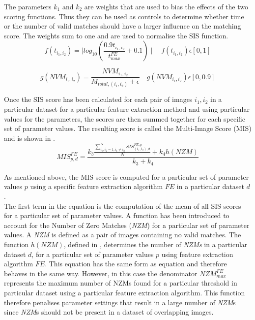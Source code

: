 \documentclass{article}
\begin{document}
The parameters $k_1$ and $k_2$ are weights that are used to bias the effects of the two scoring functions. Thus they can be used as controls to determine whether time or the number of valid matches should have a larger influence on the matching score. The weights sum to one and are used to normalise the SIS function.\\

\begin{equation}
f(t_{i_1, i_2}) = \mid log_{10}(\frac{0.9 t_{i_1, i_2}}{t_{max}^{FE}} + 0.1) \mid \quad f(t_{i_1, i_2})\epsilon [0, 1]
\label{eqn:time}
\end{equation}

\begin{equation}
g(NVM_{i_1, i_2}) = \frac{NVM_{i_1, i_2}}{M_{total, (i_1, i_2)} + \epsilon} \quad g(NVM_{i_1, i_2}) \epsilon [0, 0.9] %
\label{eqn:nvm}
\end{equation}

Once the SIS score has been calculated for each pair of images $i_1, i_2$ in a particular dataset for a particular feature extraction method and using particular values for the parameters, the scores are then summed together for each specific set of parameter values. The resulting score is called the Multi-Image Score (MIS) and is shown in .\\

\begin{equation}
MIS_{p, d}^{FE} = \frac{k_3 \frac{\sum_{i_1, i_2=1 , i_1 \neq i_2}^{N} \textit{SIS}_{(i_1, i_2),d}^{FE,p}}{N} + k_4 h(\textit{NZM})}{k_3 + k_4}
\label{eqn:mims}
\end{equation}

As mentioned above, the MIS score is computed for a particular set of parameter values $p$ using a specific feature extraction algorithm $FE$ in  a particular dataset $d$. \\

The first term in the equation is the computation of the mean of all SIS scores for a particular set of parameter values. A function has been introduced to account for the Number of Zero Matches (\textit{NZM}) for a particular set of parameter values. A \textit{NZM} is defined as a pair of images containing no valid matches. The function $h(NZM)$, defined in , determines the number of \textit{NZMs} in a particular dataset $d$, for a particular set of parameter values $p$ using feature extraction algorithm $FE$. This equation has the same form as equation  and therefore behaves in the same way. However, in this case the denominator $\textit{NZM}_{max}^{FE}$ represents the maximum number of NZMs found for a particular threshold in particular dataset using a particular feature extraction algorithm. This function therefore penalises parameter settings that result in a large number of \textit{NZM}s since \textit{NZM}s should not be present in a dataset of overlapping images. \\
\end{document}
